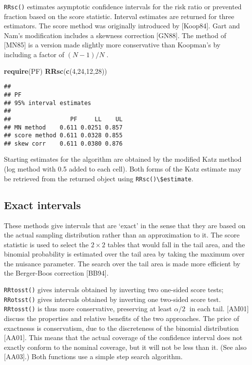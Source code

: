 \documentclass[]{article}
\newenvironment{Shaded}{\begin{snugshade}}{\end{snugshade}}
\newcommand{\KeywordTok}[1]{\textcolor[rgb]{0.13,0.29,0.53}{\textbf{{#1}}}}
\newcommand{\DecValTok}[1]{\textcolor[rgb]{0.00,0.00,0.81}{{#1}}}
\newcommand{\NormalTok}[1]{{#1}}
\begin{document}
\texttt{RRsc()} estimates asymptotic confidence intervals for the risk
ratio or prevented fraction based on the score statistic. Interval
estimates are returned for three estimators. The score method was
originally introduced by {[}Koop84{]}. Gart and Nam's modification
includes a skewness correction {[}GN88{]}. The method of {[}MN85{]} is a
version made slightly more conservative than Koopman's by including a
factor of \({(N-1)}/{N}\;\). \pagebreak

\begin{Shaded}
\begin{Highlighting}[]
\KeywordTok{require}\NormalTok{(PF)}
\KeywordTok{RRsc}\NormalTok{(}\KeywordTok{c}\NormalTok{(}\DecValTok{4}\NormalTok{,}\DecValTok{24}\NormalTok{,}\DecValTok{12}\NormalTok{,}\DecValTok{28}\NormalTok{))}
\end{Highlighting}
\end{Shaded}

\begin{verbatim}
## 
## PF 
## 95% interval estimates
## 
##                 PF     LL    UL
## MN method    0.611 0.0251 0.857
## score method 0.611 0.0328 0.855
## skew corr    0.611 0.0380 0.876
\end{verbatim}

\bigskip
Starting estimates for the algorithm are obtained by the modified Katz
method (log method with 0.5 added to each cell). Both forms of the Katz
estimate may be retrieved from the returned object using
\texttt{RRsc()\textbackslash{}\$estimate}.

\subsection{Exact intervals}\label{exact-intervals}

These methods give intervals that are `exact' in the sense that they are
based on the actual sampling distribution rather than an approximation
to it. The score statistic is used to select the \(2 \times 2\) tables
that would fall in the tail area, and the binomial probability is
estimated over the tail area by taking the maximum over the nuisance
parameter. The search over the tail area is made more efficient by the
Berger-Boos correction {[}BB94{]}.

\texttt{RRtosst()} gives intervals obtained by inverting two one-sided
score tests; \texttt{RRotsst()} gives intervals obtained by inverting
one two-sided score test. \texttt{RRtosst()} is thus more conservative,
preserving at least \({\alpha }/{2}\;\) in each tail. {[}AM01{]} discuss
the properties and relative benefits of the two approaches. The price of
exactnesss is conservatism, due to the discreteness of the binomial
distribution {[}AA01{]}. This means that the actual coverage of the
confidence interval does not exactly conform to the nominal coverage,
but it will not be less than it. (See also {[}AA03{]}.) Both functions
use a simple step search algorithm.
\end{document}

